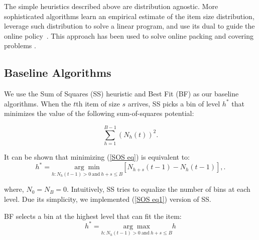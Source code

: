\documentclass[letterpaper]{article} %
\begin{document}
The simple heuristics described above are distribution agnostic. More sophisticated algorithms learn an empirical estimate of the item size distribution, leverage such distribution to solve a linear program, and use its dual to guide the online policy~\cite{IyengarSigman2004}. This approach has been used to solve online packing and covering problems \cite{GuptaMolinaro2014,AgrawalDevanur2015}.


\subsection{Baseline Algorithms}
We use the Sum of Squares (SS) heuristic and Best Fit (BF) as our baseline algorithms. 
When the $t$th item of size $s$ arrives, SS picks a bin of level $h^*$ that minimizes the value of the following sum-of-squares potential:

\begin{equation}
\sum_{h=1}^{B-1} (N_{h}(t))^2 \label{SOS eq}.
\end{equation}

\noindent It can be shown that minimizing (\ref{SOS eq}) is equivalent to:
\begin{equation}
h^* = \underset{h:N_h(t-1)>0 \ \text{and} \ h+s \leq B}{\arg\min} [N_{h+s}(t-1) - N_h(t-1)], \label{SOS eq1}.
\end{equation}

\noindent where, $N_0 = N_B = 0$. Intuitively, SS tries to equalize the number of bins at each level. Due its simplicity, we implemented (\ref{SOS eq1}) version of SS.

BF selects a bin at the highest level that can fit the item:
\begin{equation}
h^* = \underset{h:N_h(t-1)>0 \ \text{and} \ h+s \leq B}{\arg\max} h
\end{equation}
\end{document}
